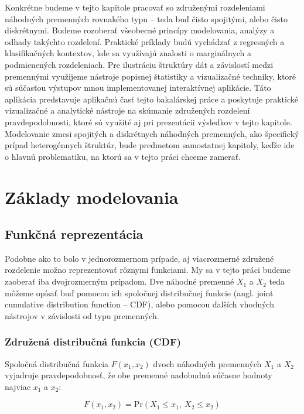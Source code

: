 Konkrétne budeme v tejto kapitole pracovať so združenými rozdeleniami náhodných premenných rovnakého typu – teda buď čisto spojitými, alebo čisto diskrétnymi. Budeme rozoberať všeobecné princípy modelovania, analýzy a odhady takýchto rozdelení. Praktické príklady budú vychádzať z regresných a klasifikačných kontextov, kde sa využívajú znalosti o marginálnych a podmienených rozdeleniach. Pre ilustráciu štruktúry dát a závislostí medzi premennými využijeme nástroje popisnej štatistiky a vizualizačné techniky, ktoré sú súčasťou výstupov mnou implementovanej interaktívnej aplikácie. Táto aplikácia predstavuje aplikačnú časť tejto bakalárskej práce a poskytuje praktické vizualizačné a analytické nástroje na skúmanie združených rozdelení pravdepodobnosti, ktoré sú využité aj pri prezentácii výsledkov v tejto kapitole. Modelovanie zmesi spojitých a diskrétnych náhodných premenných, ako špecifický prípad heterogénnych štruktúr, bude predmetom samostatnej kapitoly, keďže ide o hlavnú problematiku, na ktorú sa v tejto práci chceme zamerať.


\section{Základy modelovania}\label{sec:joint_zaklady_modelovania}

\subsection{Funkčná reprezentácia}\label{subsec:joint_representation}

Podobne ako to bolo v jednorozmernom prípade, aj viacrozmerné združené rozdelenie možno reprezentovať rôznymi funkciami. My sa v tejto práci budeme zaoberať iba dvojrozmerným prípadom. Dve náhodné premenné $X_1$ a $X_2$ teda môžeme opísať buď pomocou ich spoločnej distribučnej funkcie (angl. joint cumulative distribution function – CDF), alebo pomocou ďalších vhodných nástrojov v závislosti od typu premenných.

\subsubsection{Združená distribučná funkcia (CDF)}\label{subsec:joint_cdf}

Spoločná distribučná funkcia $F(x_1, x_2)$ dvoch náhodných premenných $X_1$ a $X_2$ vyjadruje pravdepodobnosť, že obe premenné nadobudnú súčasne hodnoty najviac $x_1$ a $x_2$:

\begin{equation}
F(x_1, x_2) = \mathrm{Pr}(X_1 \leq x_1,\ X_2 \leq x_2)
\end{equation}

